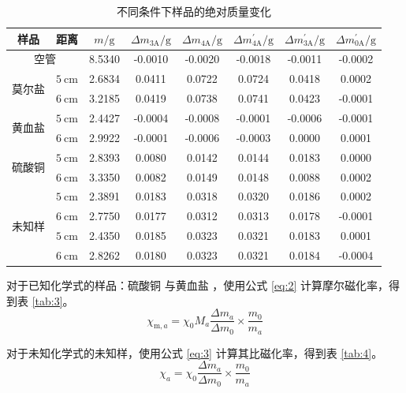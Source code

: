 \documentclass[cn,hazy,pku,12pt,normal,math=newtx,cite=super]{elegantnote}
\begin{document}
\begin{table}[H]
\centering
\caption{不同条件下样品的绝对质量变化}
\begin{tabular}{cccccccc}
\toprule
样品 & 距离 & $m/ \mathrm{g}$ & $\Delta m_{3\mathrm{A}} / \mathrm{g}$ & $\Delta m_{4\mathrm{A}} / \mathrm{g}$ & $\Delta m_{4\mathrm{A}}^\prime / \mathrm{g}$ & $\Delta m_{3\mathrm{A}}^\prime / \mathrm{g}$ & $\Delta m_{0\mathrm{A}}^\prime / \mathrm{g}$ \\
\midrule
\multicolumn{2}{c}{空管} & 
8.5340 & -0.0010 & -0.0020 & -0.0018 & -0.0011 & -0.0002 \\
\midrule
\multirow{2}{*}{莫尔盐} & $5 \mathrm{~cm}$ & 2.6834 & 0.0411 & 0.0722 & 0.0724 & 0.0418 & 0.0002 \\
& $6 \mathrm{~cm}$ &  3.2185 &  0.0419 &  0.0738 &  0.0741 &  0.0423 & -0.0001 \\
\midrule
\multirow{2}{*}{黄血盐} & $5 \mathrm{~cm}$ &  2.4427 & -0.0004 & -0.0008 & -0.0001 & -0.0006 & -0.0001 \\
& $6 \mathrm{~cm}$ &  2.9922 & -0.0001 & -0.0006 & -0.0003 &  0.0000 &  0.0001 \\
\midrule
\multirow{2}{*}{硫酸铜} & $5 \mathrm{~cm}$ & 2.8393 & 0.0080 & 0.0142 & 0.0144 & 0.0183 & 0.0000 \\
& $6 \mathrm{~cm}$ & 3.3350 & 0.0082 & 0.0149 & 0.0148 & 0.0088 & 0.0002 \\
\midrule
\multirow{4}{*}{未知样} & $5 \mathrm{~cm}$ & 2.3891 & 0.0183 & 0.0318 & 0.0320 & 0.0186 & 0.0002 \\
& $6 \mathrm{~cm}$ & 2.7750 &  0.0177 &  0.0312 &  0.0313 &  0.0178 & -0.0001 \\
& $5 \mathrm{~cm}$ & 2.4350 & 0.0185 & 0.0323 & 0.0321 & 0.0183 & 0.0001 \\
& $6 \mathrm{~cm}$  & 2.8262 &  0.0180 &  0.0323 &  0.0321 &  0.0184 & -0.0004 \\
\bottomrule
\end{tabular}
\label{tab:2}
\end{table}

对于已知化学式的样品：硫酸铜  与黄血盐 ，使用公式 \eqref{eq:2} 计算摩尔磁化率，得到表 \ref{tab:3}。
\begin{equation}\label{eq:2}
    \chi_{\mathrm{m},a}=\chi_0 M_a\frac{\Delta m_a}{\Delta m_0} \times \frac{m_0}{m_a}
\end{equation}

对于未知化学式的未知样，使用公式 \eqref{eq:3} 计算其比磁化率，得到表 \ref{tab:4}。
\begin{equation}\label{eq:3}
    \chi_a=\chi_0 \frac{\Delta m_a}{\Delta m_0} \times \frac{m_0}{m_a}
\end{equation}
\end{document}
